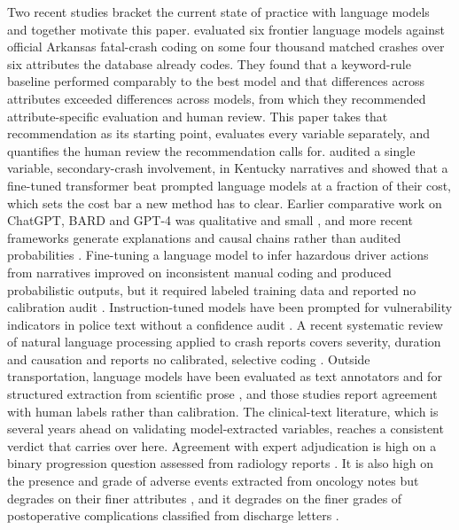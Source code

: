 Two recent studies bracket the current state of practice with language models and together
motivate this paper. \citet{bharati2026benchmarking} evaluated six frontier language models
against official Arkansas fatal-crash coding on some four thousand matched crashes over six attributes
the database already codes. They found that a keyword-rule baseline performed comparably to
the best model and that differences across attributes exceeded differences across models,
from which they recommended attribute-specific evaluation and human review. This paper takes
that recommendation as its starting point, evaluates every variable separately, and
quantifies the human review the recommendation calls for. \citet{zhang2025secondary} audited
a single variable, secondary-crash involvement, in Kentucky narratives and showed that a
fine-tuned transformer beat prompted language models at a fraction of their cost, which sets
the cost bar a new method has to clear. Earlier comparative work on ChatGPT, BARD and GPT-4
was qualitative and small \citep{mumtarin2023llm}, and more recent frameworks generate
explanations and causal chains rather than audited probabilities
\citep{crashsage2025,su2026llmdriven}. Fine-tuning a language model to infer hazardous driver actions from narratives improved on inconsistent manual coding and produced probabilistic outputs, but it required labeled training data and reported no calibration audit \citep{hazardous2025}. Instruction-tuned models have been prompted for vulnerability indicators in police text without a confidence audit \citep{vulnerability2024}. A recent systematic review of natural language processing applied to crash reports covers severity, duration and causation and reports no calibrated, selective coding \citep{nlpsafety2026review}. Outside transportation, language models have been evaluated as text annotators \citep{gilardi2023chatgpt,ding2023annotator,ziems2024css}
and for structured extraction from scientific prose \citep{dagdelen2024structured}, and
those studies report agreement with human labels rather than calibration. The
clinical-text literature, which is several years ahead on validating model-extracted
variables, reaches a consistent verdict that carries over here. Agreement with expert adjudication is high on a binary progression question assessed from radiology reports \citep{kristjnsson2026prompting}. It is also high on the presence and grade of adverse events extracted from oncology notes but degrades on their finer attributes \citep{guillot2026extracting}, and it degrades on the finer grades of postoperative complications classified from discharge letters \citep{warmer2026zeroshot}.
